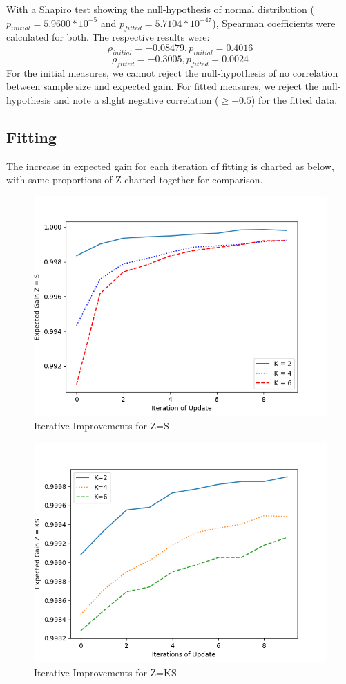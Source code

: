 \documentclass[10pt, conference]{IEEEtran}
\begin{document}
With a Shapiro test showing  the null-hypothesis of normal distribution ($p_{initial}=5.9600*10^{-5}$ and $p_{fitted}=5.7104*10^{-47}$), Spearman coefficients were calculated for both. The respective results were:
\begin{equation*}
\rho_{initial}=-0.08479, p_{initial}=0.4016
\end{equation*}
\begin{equation*}
\rho_{fitted}=-0.3005, p_{fitted}=0.0024
\end{equation*}
For the initial measures, we cannot reject the null-hypothesis of no correlation between sample size and expected gain. For fitted measures, we reject the null-hypothesis and note a slight negative correlation ($\geq-0.5$) for the fitted data.
\subsection{Fitting}
The increase in expected gain for each iteration of fitting is charted as below, with same proportions of Z charted together for comparison. 
\begin{figure}[htbp]
\centerline{\includegraphics[scale=0.5]{Z_S.png}}
\caption{Iterative Improvements for Z=S}
\label{fig}
\end{figure}
\begin{figure}[htbp]
\centerline{\includegraphics[scale=0.5]{Z_KS.png}}
\caption{Iterative Improvements for Z=KS}
\label{fig}
\end{figure}
\end{document}
